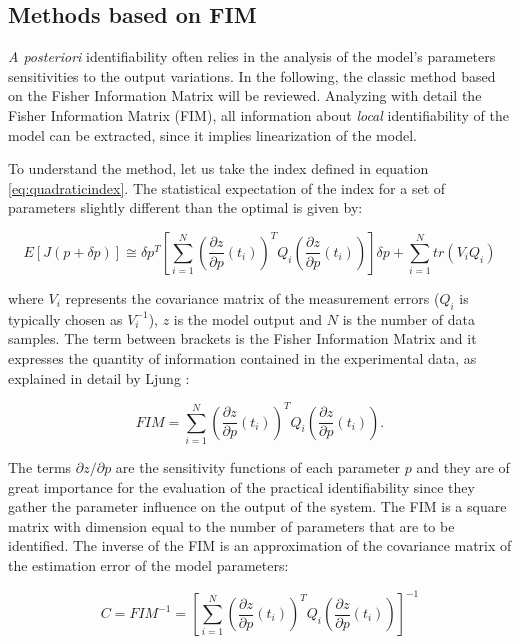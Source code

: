 \subsection{Methods based on FIM}
\label{sec:MethodsBasedOnFIM}

\textit{A posteriori} identifiability often relies in the analysis of the model's parameters sensitivities to the output variations. In the following, the classic method based on the Fisher Information Matrix will be reviewed. Analyzing with detail the Fisher Information Matrix (FIM), all information about \emph{local} identifiability of the model can be extracted, since it implies linearization of the model.

To understand the method, let us take the index defined in equation \eqref{eq:quadraticindex}. The statistical expectation of the index for a set of parameters slightly different than the optimal is given by:

\begin{equation}
	E[J(p+\delta p)]\cong \delta p^{T}\left[\sum_{i=1}^{N}{(\frac{\partial z}{\partial p}(t_{i}))^{T}Q_{i}(\frac{\partial z}{\partial p}(t_{i}))}\right]\delta p + \sum_{i=1}^{N}{tr(V_{i}Q_{i})}
\label{eq:indexdiff}
\end{equation}

where $V_{i}$ represents the covariance matrix of the measurement errors ($Q_{i}$ is typically chosen as $V_{i}^{-1}$), $z$ is the model output and $N$ is the number of data samples. The term between brackets is the Fisher Information Matrix and it expresses the quantity of information contained in the experimental data, as explained in detail by Ljung \cite{ljung1999system}:

\begin{equation}
	FIM=\sum_{i=1}^{N}{\left(\frac{\partial z}{\partial p}(t_{i})\right)^{T}Q_{i}\left(\frac{\partial z}{\partial p}(t_{i})\right)}.
\label{eq:FIM}
\end{equation}

The terms $\partial z /\partial p$ are the sensitivity functions of each parameter $p$ and they are of great importance for the evaluation of the practical identifiability since they gather the parameter influence on the output of the system. The FIM is a square matrix with dimension equal to the number of parameters that are to be identified. The inverse of the FIM is an approximation of the covariance matrix of the estimation error of the model parameters:

\begin{equation}
	C=FIM^{-1}=\left[\sum_{i=1}^{N}{(\frac{\partial z}{\partial p}(t_{i}))^{T}Q_{i}(\frac{\partial z}{\partial p}(t_{i}))}\right]^{-1}
\label{eq:BLUE}
\end{equation}

